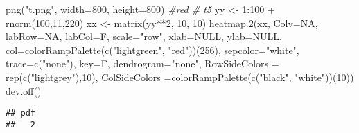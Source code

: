 \documentclass[
]{article}
\newenvironment{Shaded}{\begin{snugshade}}{\end{snugshade}}
\newcommand{\AttributeTok}[1]{\textcolor[rgb]{0.77,0.63,0.00}{#1}}
\newcommand{\CommentTok}[1]{\textcolor[rgb]{0.56,0.35,0.01}{\textit{#1}}}
\newcommand{\ConstantTok}[1]{\textcolor[rgb]{0.00,0.00,0.00}{#1}}
\newcommand{\DecValTok}[1]{\textcolor[rgb]{0.00,0.00,0.81}{#1}}
\newcommand{\FunctionTok}[1]{\textcolor[rgb]{0.00,0.00,0.00}{#1}}
\newcommand{\NormalTok}[1]{#1}
\newcommand{\OtherTok}[1]{\textcolor[rgb]{0.56,0.35,0.01}{#1}}
\newcommand{\SpecialCharTok}[1]{\textcolor[rgb]{0.00,0.00,0.00}{#1}}
\newcommand{\StringTok}[1]{\textcolor[rgb]{0.31,0.60,0.02}{#1}}
\begin{document}
\begin{Shaded}
\begin{Highlighting}[]
\FunctionTok{png}\NormalTok{(}\StringTok{"t.png"}\NormalTok{, }\AttributeTok{width=}\DecValTok{800}\NormalTok{, }\AttributeTok{height=}\DecValTok{800}\NormalTok{) }\CommentTok{\#red \# t5}
\NormalTok{yy }\OtherTok{\textless{}{-}} \DecValTok{1}\SpecialCharTok{:}\DecValTok{100} \SpecialCharTok{+} \FunctionTok{rnorm}\NormalTok{(}\DecValTok{100}\NormalTok{,}\DecValTok{11}\NormalTok{,}\DecValTok{220}\NormalTok{)}
\NormalTok{xx }\OtherTok{\textless{}{-}} \FunctionTok{matrix}\NormalTok{(yy}\SpecialCharTok{**}\DecValTok{2}\NormalTok{, }\DecValTok{10}\NormalTok{, }\DecValTok{10}\NormalTok{)}
\FunctionTok{heatmap.2}\NormalTok{(xx, }\AttributeTok{Colv=}\ConstantTok{NA}\NormalTok{, }\AttributeTok{labRow=}\ConstantTok{NA}\NormalTok{, }\AttributeTok{labCol=}\NormalTok{F, }\AttributeTok{scale=}\StringTok{"row"}\NormalTok{, }\AttributeTok{xlab=}\ConstantTok{NULL}\NormalTok{,}
          \AttributeTok{ylab=}\ConstantTok{NULL}\NormalTok{, }\AttributeTok{col=}\FunctionTok{colorRampPalette}\NormalTok{(}\FunctionTok{c}\NormalTok{(}\StringTok{"lightgreen"}\NormalTok{, }\StringTok{"red"}\NormalTok{))(}\DecValTok{256}\NormalTok{),  }
        \AttributeTok{sepcolor=}\StringTok{"white"}\NormalTok{, }\AttributeTok{trace=}\FunctionTok{c}\NormalTok{(}\StringTok{"none"}\NormalTok{), }\AttributeTok{key=}\NormalTok{F, }\AttributeTok{dendrogram=}\StringTok{"none"}\NormalTok{,}
        \AttributeTok{RowSideColors =} \FunctionTok{rep}\NormalTok{(}\FunctionTok{c}\NormalTok{(}\StringTok{"lightgrey"}\NormalTok{),}\DecValTok{10}\NormalTok{),}
        \AttributeTok{ColSideColors =}\FunctionTok{colorRampPalette}\NormalTok{(}\FunctionTok{c}\NormalTok{(}\StringTok{"black"}\NormalTok{, }\StringTok{"white"}\NormalTok{))(}\DecValTok{10}\NormalTok{))}
\FunctionTok{dev.off}\NormalTok{()}
\end{Highlighting}
\end{Shaded}

\begin{verbatim}
## pdf 
##   2
\end{verbatim}
\end{document}
